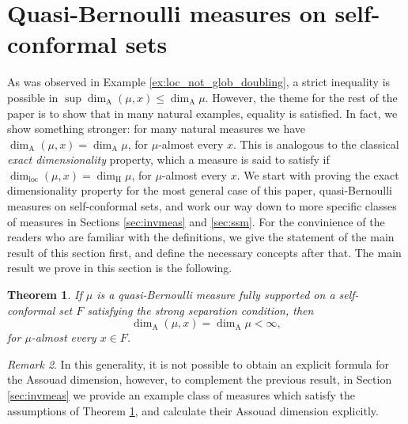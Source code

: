 \documentclass{PRM}
\newcommand{\adim}{\dim_{\mathrm{A}}}
\theoremstyle{plain}
\newtheorem{thm}{Theorem}[section]
\theoremstyle{definition}
\theoremstyle{remark}
\newtheorem{huom}[thm]{Remark}
\begin{document}
\section{Quasi-Bernoulli measures on self-conformal sets}\label{sec:qb-meas}
As was observed in Example \ref{ex:loc_not_glob_doubling}, a strict inequality is possible in $\sup\adim(\mu,x)\leq \adim\mu$. However, the theme for the rest of the paper is to show that in many natural examples, equality is satisfied. In fact, we show something stronger: for many natural measures we have $\adim(\mu,x)=\adim\mu$, for $\mu$-almost every $x$. This is analogous to the classical \emph{exact dimensionality} property, which a measure is said to satisfy if $\dim_{\mathrm{loc}}(\mu,x)=\dim_{\mathrm{H}}\mu$, for $\mu$-almost every $x$. We start with proving the exact dimensionality property for the most general case of this paper, quasi-Bernoulli measures on self-conformal sets, and work our way down to more specific classes of measures in Sections \ref{sec:invmeas} and \ref{sec:ssm}. For the convinience of the readers who are familiar with the definitions, we give the statement of the main result of this section first, and define the necessary concepts after that. The main result we prove in this section is the following.

\begin{thm}\label{thm:quasi-bernoulli-exact-assouad}
    If $\mu$ is a quasi-Bernoulli measure fully supported on a self-conformal set $F$ satisfying the strong separation condition, then
    \begin{equation*}
        \dim_{\mathrm{A}}(\mu,x)=\dim_{\mathrm{A}}\mu<\infty,
    \end{equation*}
    for $\mu$-almost every $x\in F$.
\end{thm}
\begin{huom}
    In this generality, it is not possible to obtain an explicit formula for the Assouad dimension, however, to complement the previous result, in Section \ref{sec:invmeas} we provide an example class of measures which satisfy the assumptions of Theorem \ref{thm:quasi-bernoulli-exact-assouad}, and calculate their Assouad dimension explicitly.
\end{huom}
\end{document}
